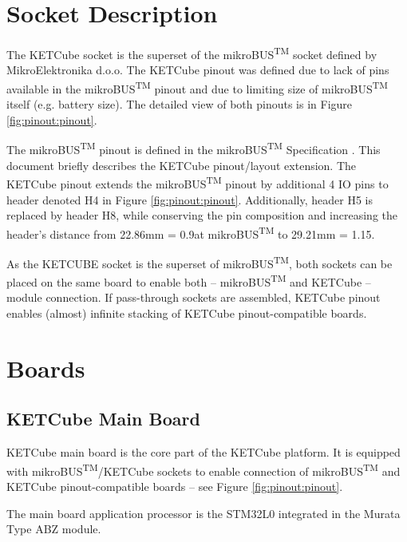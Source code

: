 \clearpage
\section{Socket Description}\label{pinout}

The KETCube socket is the superset of the mikroBUS\textsuperscript{TM} socket defined by MikroElektronika d.o.o. The KETCube pinout was defined due to lack of pins available in the mikroBUS\textsuperscript{TM} pinout and due to limiting size of mikroBUS\textsuperscript{TM} itself (e.g. battery size). The detailed view of both pinouts is in Figure \ref{fig:pinout:pinout}.

The mikroBUS\textsuperscript{TM} pinout is defined in the mikroBUS\textsuperscript{TM} Specification \cite{MikroE:mikroBUS}. This document briefly describes the KETCube pinout/layout extension. The KETCube pinout extends the mikroBUS\textsuperscript{TM} pinout by additional 4 IO pins to header denoted H4 in Figure \ref{fig:pinout:pinout}. Additionally, header H5 is replaced by header H8, while conserving the pin composition and increasing the header's distance from 22.86mm = 0.9\textquotedbl at mikroBUS\textsuperscript{TM} to 29.21mm = 1.15\textquotedbl.

As the KETCUBE socket is the superset of mikroBUS\textsuperscript{TM}, both sockets can be placed on the same board to enable both -- mikroBUS\textsuperscript{TM} and KETCube -- module connection. If pass-through sockets are assembled, KETCube pinout enables (almost) infinite stacking of KETCube pinout-compatible boards.


\clearpage
\section{Boards}\label{boards}

\subsection{KETCube Main Board}
  KETCube main board is the core part of the KETCube platform. It is equipped with mikroBUS\textsuperscript{TM}/KETCube sockets to enable connection of mikroBUS\textsuperscript{TM} and KETCube pinout-compatible boards -- see Figure \ref{fig:pinout:pinout}.
  
  The main board application processor is the STM32L0 \cite{STM32:STM32L082CZ} integrated in the Murata Type ABZ \cite{Murata:ABZ} module.
   
